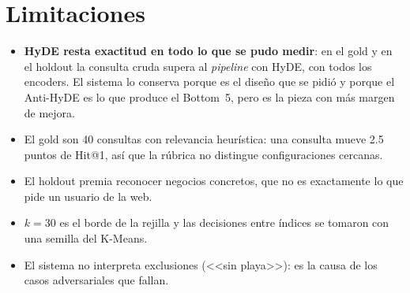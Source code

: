 \documentclass[11pt,a4paper]{article}
\begin{document}
\section{Limitaciones}
\begin{itemize}
  \item \textbf{HyDE resta exactitud en todo lo que se pudo medir}: en el gold y en el holdout la
        consulta cruda supera al \emph{pipeline} con HyDE, con todos los encoders. El sistema lo
        conserva porque es el diseño que se pidió y porque el Anti-HyDE es lo que produce el
        Bottom~5, pero es la pieza con más margen de mejora.
  \item El gold son 40 consultas con relevancia heurística: una consulta mueve 2.5 puntos de
        Hit@1, así que la rúbrica no distingue configuraciones cercanas.
  \item El holdout premia reconocer negocios concretos, que no es exactamente lo que pide un
        usuario de la web.
  \item $k=30$ es el borde de la rejilla y las decisiones entre índices se tomaron con una semilla
        del K-Means.
  \item El sistema no interpreta exclusiones (<<sin playa>>): es la causa de los casos
        adversariales que fallan.
\end{itemize}
\end{document}
